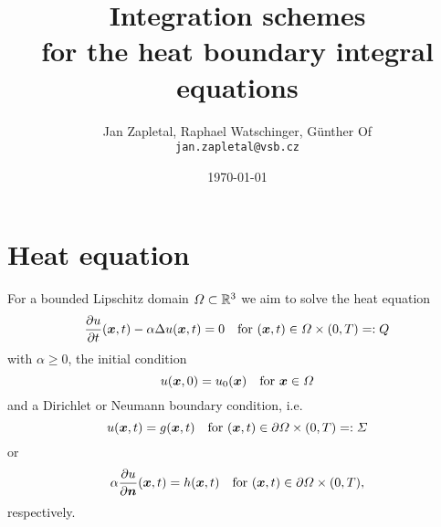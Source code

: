 \documentclass[a4paper,11pt]{article}
\title{\sffamily\bfseries Integration schemes \\ for the heat boundary integral equations}
\author{Jan Zapletal, Raphael Watschinger, Günther Of\\\texttt{jan.zapletal@vsb.cz}}
\date{\today}
\begin{document}

\maketitle
\thispagestyle{empty}
\vfill
\tableofcontents
\thispagestyle{empty}
\vfill
\newpage

\pagestyle{plain}
\setcounter{page}{1}

\section{Heat equation}


For a bounded Lipschitz domain $\Omega \subset {\mathbb{R}}^3$ we aim to solve the heat equation \cite{Mes2014,MesSchTau2014,MesSchTau2015}
\begin{equation}
  \label{eq:heat_eq}
  \frac{\partial u}{\partial t}(\vx,t) - \alpha \upDelta u(\vx,t) = 0 \quad\text{for } (\vx,t) \in \Omega \times (0,T) =: Q
\end{equation}
with $\alpha \geq 0$, the initial condition
\begin{equation*}
  u({{\bm{x}}},0) = u_0({{\bm{x}}}) \quad\text{for }{\ensuremath{{\bm{x}}}} \in \Omega
\end{equation*}
and a Dirichlet or Neumann boundary condition, i.e.
\begin{equation*}
  u({{\bm{x}}},t) = g({{\bm{x}}},t) \quad\text{for }({{\bm{x}}},t) \in \partial\Omega \times (0,T) =: \Sigma
\end{equation*}
or
\begin{equation*}
  \alpha\frac{\partial u}{\partial {\ensuremath{{\bm{n}}}}}({{\bm{x}}},t) = h({{\bm{x}}},t) \quad\text{for }({{\bm{x}}},t) \in \partial\Omega \times (0,T),
\end{equation*}
respectively.
\end{document}
